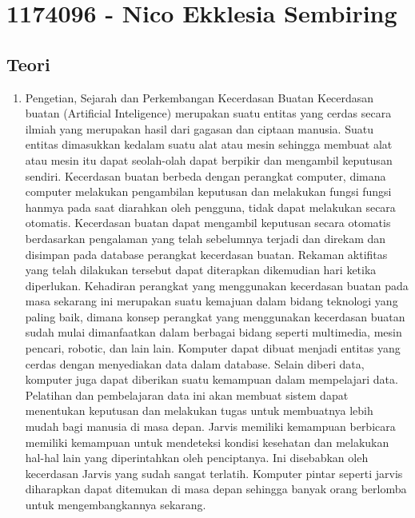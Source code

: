 \section{1174096 - Nico Ekklesia Sembiring}
\subsection{Teori}
\begin{enumerate}
	\item Pengetian, Sejarah dan Perkembangan Kecerdasan Buatan
	\hfill\break
    Kecerdasan buatan (Artificial Inteligence) merupakan suatu entitas yang cerdas secara ilmiah yang merupakan hasil dari gagasan dan ciptaan manusia. Suatu entitas dimasukkan kedalam suatu alat atau mesin sehingga membuat alat atau mesin itu dapat seolah-olah dapat berpikir dan mengambil keputusan sendiri. Kecerdasan buatan berbeda dengan perangkat computer, dimana computer melakukan pengambilan keputusan dan melakukan fungsi fungsi hanmya pada saat diarahkan oleh pengguna, tidak dapat melakukan secara otomatis. 
    \hfill\break
    Kecerdasan buatan dapat mengambil keputusan secara otomatis berdasarkan pengalaman yang telah sebelumnya terjadi dan direkam dan disimpan pada database perangkat kecerdasan buatan. Rekaman aktifitas yang telah dilakukan tersebut dapat diterapkan dikemudian hari ketika diperlukan. Kehadiran perangkat yang menggunakan kecerdasan buatan pada masa sekarang ini merupakan suatu kemajuan dalam bidang teknologi yang paling baik, dimana konsep perangkat yang menggunakan kecerdasan buatan sudah mulai dimanfaatkan dalam berbagai bidang seperti multimedia, mesin pencari, robotic, dan lain lain. 
    \hfill\break
    Komputer dapat dibuat menjadi entitas yang cerdas dengan menyediakan data dalam database. Selain diberi data, komputer juga dapat diberikan suatu kemampuan dalam mempelajari data. Pelatihan dan pembelajaran data ini akan membuat sistem dapat menentukan keputusan dan melakukan tugas untuk membuatnya lebih mudah bagi manusia di masa depan.
    \hfill\break
    Jarvis memiliki kemampuan berbicara memiliki kemampuan untuk mendeteksi kondisi kesehatan dan melakukan hal-hal lain yang diperintahkan oleh penciptanya. Ini disebabkan oleh kecerdasan Jarvis yang sudah sangat terlatih. Komputer pintar seperti jarvis diharapkan dapat ditemukan di masa depan sehingga banyak orang berlomba untuk mengembangkannya sekarang.
    \hfill\break



\end{enumerate}
